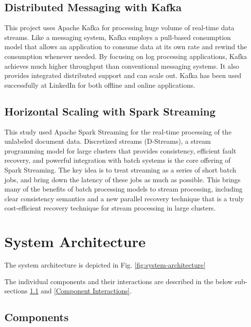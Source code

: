 \documentclass[conference]{IEEEtran}
\begin{document}
    \subsection{Distributed Messaging with Kafka}
        This project uses Apache Kafka for processing huge volume of real-time data streams. Like a messaging system, Kafka employs a pull-based consumption model that allows an application to consume data at its own rate and rewind the consumption whenever needed. By focusing on log processing applications, Kafka achieves much higher throughput than conventional messaging systems. It also provides integrated distributed support and can scale out. Kafka has been used successfully at LinkedIn for both offline and online applications. \cite{kreps2011kafka}

    \subsection{Horizontal Scaling with Spark Streaming}
        This study used Apache Spark Streaming for the real-time processing of the unlabeled document data. Discretized streams (D-Streams), a stream programming model for large clusters that provides consistency, efficient fault recovery, and powerful integration with batch systems is the core offering of Spark Streaming. The key idea is to treat streaming as a series of short batch jobs, and bring down the latency of these jobs as much as possible. This brings many of the benefits of batch processing models to stream processing, including clear consistency semantics and a new parallel recovery technique that is a truly cost-efficient recovery technique for stream processing in large clusters\cite{zaharia2012discretized}.

\vspace{5mm}

\section{System Architecture}
    The system architecture is depicted in Fig. \ref{fig:system-architecture}

    The individual components and their interactions are described in the below sub-sections \ref{Components} and \ref{Component Interactions}.

    \subsection{Components} \label{Components}
\end{document}
